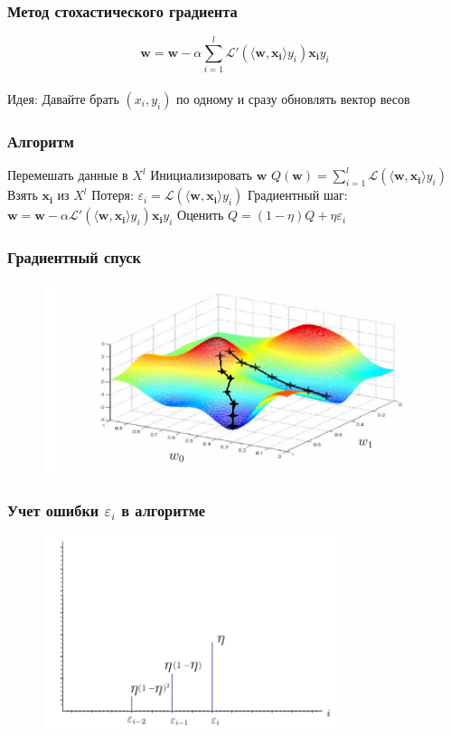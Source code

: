 \documentclass[10pt]{beamer}
\begin{document}
\begin{frame}\frametitle{Метод стохастического градиента}
	$$\mathbf{w} =  \mathbf{w} - \alpha \sum\limits_{i=1}^l \mathcal{L}'(\langle \mathbf{w}, \mathbf{x_i}\rangle y_i)\mathbf{x_i}y_i$$\\
	\bigbreak \pause
	\alert{Идея}: Давайте брать $(x_i, y_i)$ по одному и сразу обновлять вектор весов
\end{frame}

\begin{frame}\frametitle{Алгоритм}
  \begin{algorithmic}[1]
     \State Перемешать данные в $X^l$
     \State Инициализировать $\mathbf{w}$ 
     \State ${Q}(\mathbf{w}) = \sum\limits_{i=1}^l \mathcal{L}(\langle \mathbf{w}, \mathbf{x_i} \rangle y_i)$
       \State Взять $\mathbf{x_i}$ из $X^l$
       \State Потеря: $\varepsilon_i = \mathcal{L}(\langle \mathbf{w}, \mathbf{x_i} \rangle y_i)$
       \State Градиентный шаг: $\mathbf{w} =  \mathbf{w} - \alpha \mathcal{L}'(\langle \mathbf{w}, \mathbf{x_i}\rangle y_i)\mathbf{x_i}y_i$
       \State Оценить $Q = (1-\eta)Q + \eta \varepsilon_i$
     \EndRepeat
    \EndFunction
  \end{algorithmic}
\end{frame}

\begin{frame}\frametitle{Градиентный спуск}
	\begin{figure}[htbp]
	  \includegraphics[height=160pt, keepaspectratio = true]{images/gradient_descent2}
	\end{figure}
\end{frame}

\begin{frame}\frametitle{Учет ошибки $\varepsilon_i$ в алгоритме}
	\begin{figure}[htbp]
	  \includegraphics[height=160pt, keepaspectratio = true]{images/l2}
	\end{figure}
\end{frame}
\end{document}
